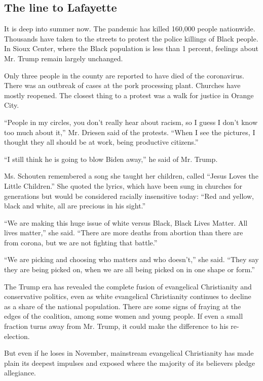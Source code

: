 \hypertarget{the-line-to-lafayette}{%
\subsection{The line to Lafayette}\label{the-line-to-lafayette}}

It is deep into summer now. The pandemic has killed 160,000 people
nationwide. Thousands have taken to the streets to protest the police
killings of Black people. In Sioux Center, where the Black population is
less than 1 percent, feelings about Mr. Trump remain largely unchanged.

Only three people in the county are reported to have died of the
coronavirus. There was an outbreak of cases at the pork processing
plant. Churches have mostly reopened. The closest thing to a protest was
a walk for justice in Orange City.

``People in my circles, you don't really hear about racism, so I guess I
don't know too much about it,'' Mr. Driesen said of the protests. ``When
I see the pictures, I thought they all should be at work, being
productive citizens.''

``I still think he is going to blow Biden away,'' he said of Mr. Trump.

Ms. Schouten remembered a song she taught her children, called ``Jesus
Loves the Little Children.'' She quoted the lyrics, which have been sung
in churches for generations but would be considered racially insensitive
today: ``Red and yellow, black and white, all are precious in his
sight.''

``We are making this huge issue of white versus Black, Black Lives
Matter. All lives matter,'' she said. ``There are more deaths from
abortion than there are from corona, but we are not fighting that
battle.''

``We are picking and choosing who matters and who doesn't,'' she said.
``They say they are being picked on, when we are all being picked on in
one shape or form.''

The Trump era has revealed the complete fusion of evangelical
Christianity and conservative politics, even as white evangelical
Christianity continues to decline as a share of the national population.
There are some signs of fraying at the edges of the coalition, among
some women and young people. If even a small fraction turns away from
Mr. Trump, it could make the difference to his re-election.

But even if he loses in November, mainstream evangelical Christianity
has made plain its deepest impulses and exposed where the majority of
its believers pledge allegiance.

